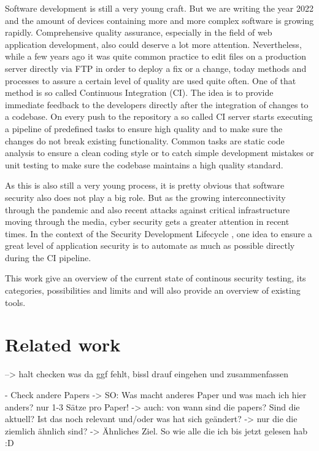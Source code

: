 \documentclass[conference]{IEEEtran}
\begin{document}
Software development is still a very young craft. But we are writing the year 2022 and the amount of devices containing more and more complex software is growing rapidly. Comprehensive quality assurance, especially in the field of web application development, also could deserve a lot more attention. Nevertheless, while a few years ago it was quite common practice to edit files on a production server directly via FTP in order to deploy a fix or a change, today methods and processes to assure a certain level of quality are used quite often. One of that method is so called Continuous Integration (CI). The idea is to provide immediate feedback to the developers directly after the integration of changes to a codebase. On every push to the repository a so called CI server starts executing a pipeline of predefined tasks to ensure high quality and to make sure the changes do not break existing functionality. Common tasks are static code analysis to ensure a clean coding style or to catch simple development mistakes or unit testing to make sure the codebase maintains a high quality standard.

As this is also still a very young process, it is pretty obvious that software security also does not play a big role. But as the growing interconnectivity through the pandemic and also recent attacks against critical infrastructure moving through the media, cyber security gets a greater attention in recent times. In the context of the Security Development Lifecycle \cite{sdl}, one idea to ensure a great level of application security is to automate as much as possible directly during the CI pipeline. 

This work give an overview of the current state of continous security testing, its categories, possibilities and limits and will also provide an overview of existing tools.  


\section{Related work}

--> halt checken was da ggf fehlt, bissl drauf eingehen und zusammenfassen

- Check andere Papers
-> SO: Was macht anderes Paper und was mach ich hier anders? nur 1-3 Sätze pro Paper!
-> auch: von wann sind die papers? Sind die aktuell? Ist das noch relevant und/oder was hat sich geändert?
-> nur die die ziemlich ähnlich sind? -> Ähnliches Ziel. So wie alle die ich bis jetzt gelesen hab :D
\end{document}
